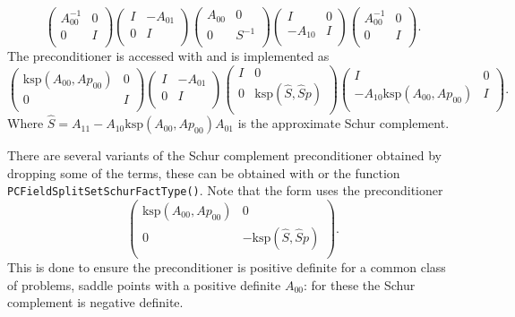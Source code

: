\[
\left( \begin{array}{cc}
A_{00}^{-1}   & 0 \\
0 & I \\
\end{array} \right)
\left( \begin{array}{cc}
I   & -A_{01} \\
0 & I \\
\end{array} \right)
\left( \begin{array}{cc}
A_{00}  & 0 \\
0 & S^{-1} \\
\end{array} \right)
\left( \begin{array}{cc}
I   & 0 \\
-A_{10} & I \\
\end{array} \right)
\left( \begin{array}{cc}
A_{00}^{-1}   & 0 \\
0 & I \\
\end{array} \right).
\]
The preconditioner is accessed with  and is implemented as
\[
\left( \begin{array}{cc}
  \text{ksp}(A_{00},Ap_{00})   & 0 \\
0 & I \\
\end{array} \right)
\left( \begin{array}{cc}
I   & -A_{01} \\
0 & I \\
\end{array} \right)
\left( \begin{array}{cc}
I  & 0 \\
  0 & \text{ksp}(\hat{S},\hat{S}p) \\
\end{array} \right)
\left( \begin{array}{cc}
I   & 0 \\
  -A_{10} \text{ksp}(A_{00},Ap_{00}) & I \\
\end{array} \right).
\]
Where $\hat{S} = A_{11} - A_{10} \text{ksp}(A_{00},Ap_{00}) A_{01}$ is the approximate Schur complement.

There are several variants of the Schur complement preconditioner obtained by dropping some of the terms, these can be obtained with  or the function \lstinline{PCFieldSplitSetSchurFactType()}. Note that the  form uses the preconditioner
\[
\left( \begin{array}{cc}
  \text{ksp}(A_{00},Ap_{00})   & 0 \\
  0 & -\text{ksp}(\hat{S},\hat{S}p) \\
\end{array} \right).
\]
This is done to ensure the preconditioner is positive definite for a common class of problems, saddle points with a positive definite $A_{00}$:
for these the Schur complement is negative definite. 


